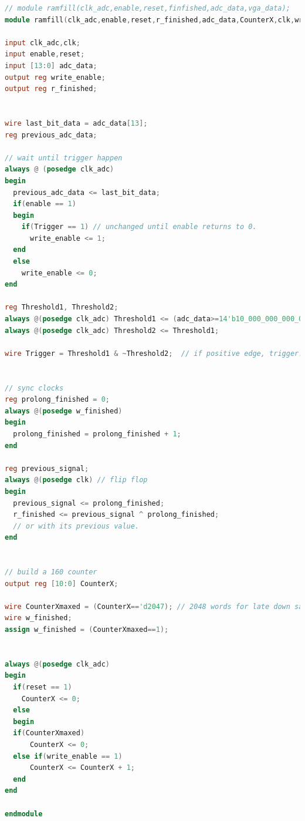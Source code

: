 \documentclass[11pt]{scrartcl}
\begin{document}
\begin{lstlisting}[language=Verilog]
// module ramfill(clk_adc,enable,reset,finfished,adc_data,vga_data);
module ramfill(clk_adc,enable,reset,r_finished,adc_data,CounterX,clk,write_enable);

input clk_adc,clk;
input enable,reset;
input [13:0] adc_data;
output reg write_enable;
output reg r_finished;


wire last_bit_data = adc_data[13];
reg previous_adc_data;

// wait until trigger happen
always @ (posedge clk_adc)
begin
  previous_adc_data <= last_bit_data;
  if(enable == 1)
  begin
    if(Trigger == 1) // unchanged until enable returns to 0.
      write_enable <= 1;
  end
  else
    write_enable <= 0;
end

reg Threshold1, Threshold2;
always @(posedge clk_adc) Threshold1 <= (adc_data>=14'b10_000_000_000_000);
always @(posedge clk_adc) Threshold2 <= Threshold1;

wire Trigger = Threshold1 & ~Threshold2;  // if positive edge, trigger! 


// sync clocks
reg prolong_finished = 0;
always @(posedge w_finished)
begin
  prolong_finished = prolong_finished + 1;
end

reg previous_signal;
always @(posedge clk) // flip flop
begin
  previous_signal <= prolong_finished; 
  r_finished <= previous_signal ^ prolong_finished;
  // or with its previous value.
end


// build a 160 counter
output reg [10:0] CounterX;

wire CounterXmaxed = (CounterX=='d2047); // 2048 words for late down sampling
wire w_finished;
assign w_finished = (CounterXmaxed==1);


always @(posedge clk_adc)
begin
  if(reset == 1)
    CounterX <= 0;
  else
  begin
  if(CounterXmaxed)
      CounterX <= 0;
  else if(write_enable == 1)
      CounterX <= CounterX + 1;
  end
end

endmodule

\end{lstlisting}
\end{document}
